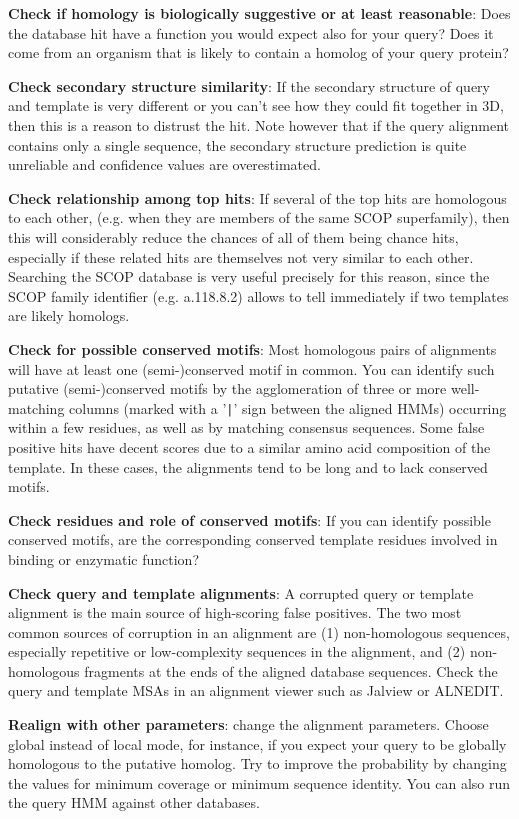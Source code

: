 \documentclass[11pt,a4paper]{article}
\begin{document}
{\bf Check if homology is biologically suggestive or at least reasonable}:
Does the database hit have a function you would expect also for your query? Does it come from an organism that is likely to contain a homolog of your query protein?

{\bf Check secondary structure similarity}:
If the secondary structure of query and template is very different or you can't see how they could fit together in 3D, then this is a reason to distrust the hit. Note however that if the query alignment contains only a single sequence, the secondary structure prediction is quite unreliable and confidence values are overestimated.

{\bf Check relationship among top hits}: 
If several of the top hits are homologous to each other, (e.g. when they are members of the same SCOP superfamily), then this will considerably reduce the chances of all of them being chance hits, especially if these related hits are themselves not very similar to each other. Searching the SCOP database is very useful precisely for this reason, since the SCOP family identifier (e.g. a.118.8.2) allows to tell immediately if two templates are likely homologs.

{\bf Check for possible conserved motifs}:
Most homologous pairs of alignments will have at least one (semi-)conserved motif in common. You can identify such putative (semi-)conserved motifs by the agglomeration of three or more well-matching columns (marked with a '\verb`|`' sign between the aligned HMMs) occurring within a few residues, as well as by matching consensus sequences. Some false positive hits have decent scores due to a similar amino acid composition of the template. In these cases, the alignments tend to be long and to lack conserved motifs.

{\bf Check residues and role of conserved motifs}: 
If you can identify possible conserved motifs, are the corresponding conserved template residues involved in binding or enzymatic function?

{\bf Check query and template alignments}: 
A corrupted query or template alignment is the main source of high-scoring false positives. The two most common sources of corruption in an alignment are (1) non-homologous sequences, especially repetitive or low-complexity sequences in the alignment, and (2) non-homologous fragments at the ends of the aligned database sequences. Check the query and template MSAs in an alignment viewer such as Jalview or ALNEDIT.

{\bf Realign with other parameters}: 
change the alignment parameters. Choose global instead of local mode, for instance, if you expect your query to be globally homologous to the putative homolog. Try to improve the probability by changing the values for minimum coverage or minimum sequence identity. You can also run the query HMM against other databases.
\end{document}
